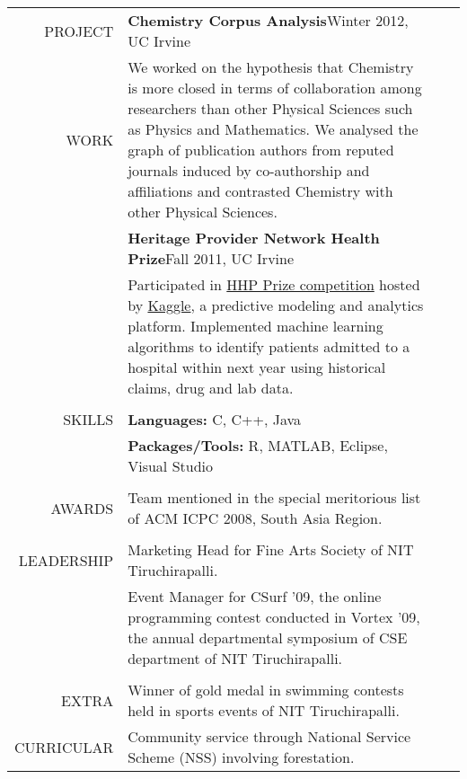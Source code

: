 \documentclass[a4paper]{article}
\begin{document}
\begin{tabularx}{\textwidth}{rX lX}
  \\*
  PROJECT & \textbf{Chemistry Corpus Analysis}\hfill Winter 2012, UC Irvine\\
  WORK & We worked on the hypothesis that Chemistry is more closed in terms of collaboration among researchers than other Physical Sciences such as Physics and Mathematics. We analysed the graph of publication authors from reputed journals induced by co-authorship and affiliations and contrasted Chemistry with other Physical Sciences.\\
  [.5\baselineskip]
  & \textbf{Heritage Provider Network Health Prize}\hfill Fall 2011, UC Irvine\\
  & Participated in \href{http://www.heritagehealthprize.com/c/hhp}{HHP Prize competition} hosted by \href{http://www.kaggle.com}{Kaggle}, a predictive modeling and analytics platform. Implemented machine learning algorithms to identify patients admitted to a hospital within next year using historical claims, drug and lab data.\\
  \\*
  SKILLS & \textbf{Languages: }C, C++, Java\\
  & \textbf{Packages/Tools: }R, MATLAB, Eclipse, Visual Studio\\
  \\*
  AWARDS & Team mentioned in the special meritorious list of ACM ICPC 2008, South Asia Region.\\
  \\*
  LEADERSHIP & Marketing Head for Fine Arts Society of NIT Tiruchirapalli.\\
  & Event Manager for CSurf ’09, the online programming contest conducted in Vortex ’09, the annual departmental symposium of CSE department of NIT Tiruchirapalli.\\
  \\*
  EXTRA & Winner of gold medal in swimming contests held in sports events of NIT Tiruchirapalli.\\
  CURRICULAR & Community service through National Service Scheme (NSS) involving forestation.
\end{tabularx}
\end{document}
